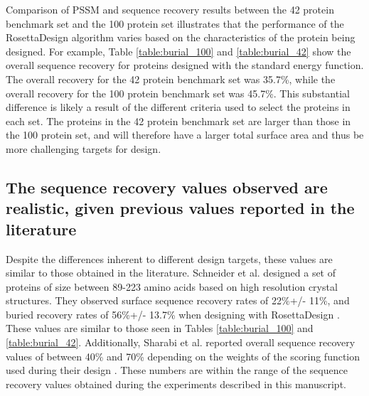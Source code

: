 Comparison of \ac{PSSM} and sequence recovery results between the 42 protein benchmark set and the 100 protein set illustrates that the performance of the RosettaDesign algorithm varies based on the characteristics of the protein being designed.
For example, Table \ref{table:burial_100} and \ref{table:burial_42} show the overall sequence recovery for proteins designed with the standard energy function.
The overall recovery for the 42 protein benchmark set was 35.7\%, while the overall recovery for the 100 protein benchmark set was 45.7\%.
This substantial difference is likely a result of the different criteria used to select the proteins in each set.
The proteins in the 42 protein benchmark set are larger than those in the 100 protein set, and will therefore have a larger total surface area and thus be more challenging targets for design.

\subsection{The sequence recovery values observed are realistic, given previous values reported in the literature}
Despite the differences inherent to different design targets, these values are similar to those obtained in the literature.
Schneider et al. designed a set of proteins of size between 89-223 amino acids based on high resolution crystal structures.
They observed surface sequence recovery rates of 22\%+/- 11\%, and buried recovery rates of 56\%+/- 13.7\% when designing with RosettaDesign \citep{Schneider:2009ig}.
These values are similar to those seen in Tables \ref{table:burial_100} and \ref{table:burial_42}.
Additionally, Sharabi et al. reported overall sequence recovery values of between 40\% and 70\% depending on the weights of the scoring function used during their design \citep{Sharabi:2011ev}.
These numbers are within the range of the sequence recovery values obtained during the experiments described in this manuscript.

